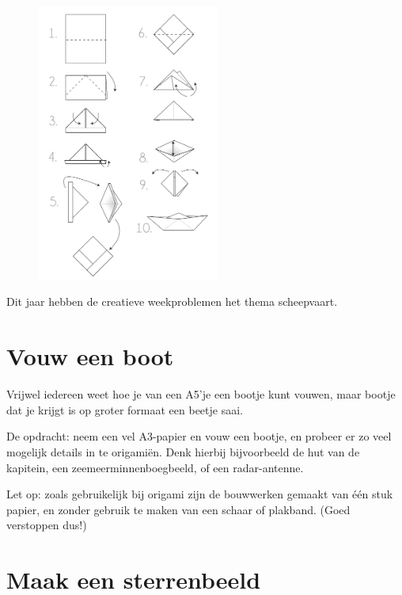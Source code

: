 \documentclass{weekprobleem}
\begin{document}

\begin{figure}
	\vspace{-6mm}
	\includegraphics[width=6cm]{origami-boot}
	\vspace{-0mm}
\end{figure}

Dit jaar hebben de creatieve weekproblemen het thema scheepvaart.

\section*{Vouw een boot}

Vrijwel iedereen weet hoe je van een A5'je een bootje kunt vouwen, maar bootje dat je krijgt is op groter formaat een beetje saai.

De opdracht: neem een vel A3-papier en vouw een bootje, en probeer er zo veel mogelijk details in te origamiën.
Denk hierbij bijvoorbeeld de hut van de kapitein, een zeemeerminnenboegbeeld, of een radar-antenne.

Let op: zoals gebruikelijk bij origami zijn de bouwwerken gemaakt van één stuk papier, en zonder gebruik te maken van een schaar of plakband.
{\tiny (Goed verstoppen dus!)}


\section*{Maak een sterrenbeeld}
\end{document}
